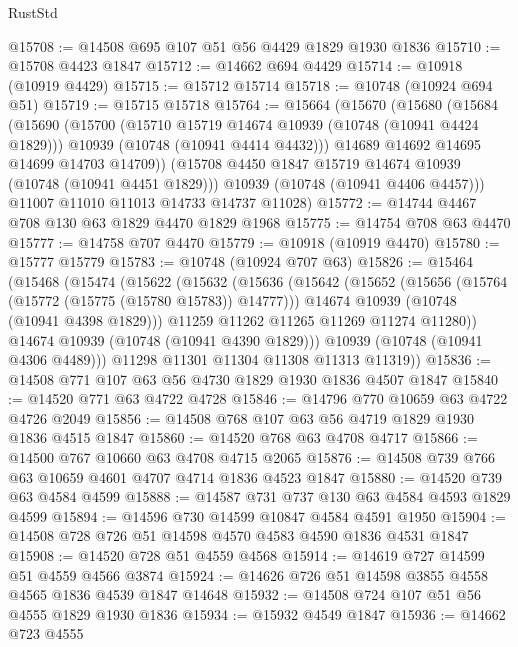 \begin{lexlean}{RustStd}
\begin{coremodule}
@15708 := @14508 @695 @107 @51 @56 @4429 @1829 @1930 @1836
@15710 := @15708 @4423 @1847
@15712 := @14662 @694 @4429
@15714 := @10918 (@10919 @4429)
@15715 := @15712 @15714
@15718 := @10748 (@10924 @694 @51)
@15719 := @15715 @15718
@15764 := @15664
    (@15670
      (@15680
        (@15684
          (@15690
            (@15700
              (@15710 @15719 @14674 @10939 (@10748 (@10941 @4424 @1829)))
              @10939
              (@10748 (@10941 @4414 @4432)))
            @14689
            @14692
            @14695
            @14699
            @14703
            @14709))
        (@15708 @4450 @1847 @15719 @14674 @10939 (@10748 (@10941 @4451 @1829)))
        @10939
        (@10748 (@10941 @4406 @4457)))
      @11007
      @11010
      @11013
      @14733
      @14737
      @11028)
@15772 := @14744 @4467 @708 @130 @63 @1829 @4470 @1829 @1968
@15775 := @14754 @708 @63 @4470
@15777 := @14758 @707 @4470
@15779 := @10918 (@10919 @4470)
@15780 := @15777 @15779
@15783 := @10748 (@10924 @707 @63)
@15826 := @15464
    (@15468
      (@15474
        (@15622
          (@15632
            (@15636
              (@15642
                (@15652
                  (@15656 (@15764 (@15772 (@15775 (@15780 @15783)) @14777)))
                  @14674
                  @10939
                  (@10748 (@10941 @4398 @1829)))
                @11259
                @11262
                @11265
                @11269
                @11274
                @11280))
            @14674
            @10939
            (@10748 (@10941 @4390 @1829)))
          @10939
          (@10748 (@10941 @4306 @4489)))
        @11298
        @11301
        @11304
        @11308
        @11313
        @11319))
@15836 := @14508 @771 @107 @63 @56 @4730 @1829 @1930 @1836 @4507 @1847
@15840 := @14520 @771 @63 @4722 @4728
@15846 := @14796 @770 @10659 @63 @4722 @4726 @2049
@15856 := @14508 @768 @107 @63 @56 @4719 @1829 @1930 @1836 @4515 @1847
@15860 := @14520 @768 @63 @4708 @4717
@15866 := @14500 @767 @10660 @63 @4708 @4715 @2065
@15876 := @14508 @739 @766 @63 @10659 @4601 @4707 @4714 @1836 @4523 @1847
@15880 := @14520 @739 @63 @4584 @4599
@15888 := @14587 @731 @737 @130 @63 @4584 @4593 @1829 @4599
@15894 := @14596 @730 @14599 @10847 @4584 @4591 @1950
@15904 := @14508 @728 @726 @51 @14598 @4570 @4583 @4590 @1836 @4531 @1847
@15908 := @14520 @728 @51 @4559 @4568
@15914 := @14619 @727 @14599 @51 @4559 @4566 @3874
@15924 := @14626 @726 @51 @14598 @3855 @4558 @4565 @1836 @4539 @1847 @14648
@15932 := @14508 @724 @107 @51 @56 @4555 @1829 @1930 @1836
@15934 := @15932 @4549 @1847
@15936 := @14662 @723 @4555

\end{coremodule}
\end{lexlean}
